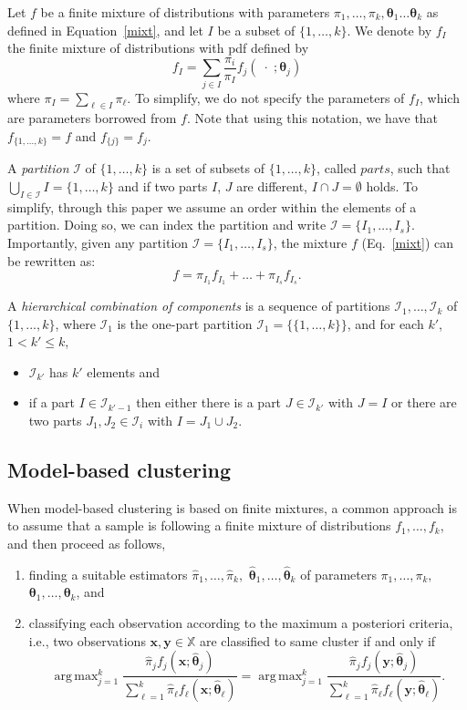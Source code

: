\documentclass[10pt, a4paper]{article}
\DeclareMathOperator*{\argmax}{arg\,max}
\newcommand{\m}[1]{\boldsymbol{#1}}
\begin{document}
Let $f$ be a finite mixture of distributions with  parameters  $\pi_1, \dots, \pi_k, \m\theta_1 \dots \m\theta_k$ as defined in Equation~\ref{mixt}, and let $I$  be a subset of $\{1, \dots, k\}$. We denote by $f_I$ the finite mixture of distributions with pdf defined by
\[
f_I = \sum_{j \in I} \frac{\pi_i}{\pi_I} f_j(\;\cdot\; ; \m\theta_j)
\]
where $\pi_I = \sum_{\ell \in I} \pi_\ell$. To simplify, we do not specify the parameters of $f_I$, which are parameters borrowed from $f$. Note that using this notation, we have that $f_{\{1, \dots, k\}} = f$ and $f_{\{j\}} = f_j$.

A \emph{partition} $\mathcal{I}$ of $\{1, \dots, k\}$ is a set of subsets of $\{1, \dots, k\}$, called $parts$, such that $\bigcup_{I \in \mathcal{I}} I = \{1, \dots, k\}$ and  if two parts $I$, $J$ are different, $I \cap J = \emptyset$ holds. To simplify, through this paper we assume an order within the elements of a partition. Doing so, we can index the partition and write $\mathcal{I} = \{ I_1, \dots, I_s\}$. Importantly, given any partition $\mathcal{I} = \{ I_1, \dots, I_s\}$, the mixture $f$ (Eq.~\ref{mixt}) can be rewritten as:
\[
f = \pi_{I_1} f_{I_1} + \dots + \pi_{I_s} f_{I_s}.
\]


A \emph{hierarchical combination of components} is a sequence of partitions $\mathcal{I}_1, \dots, \mathcal{I}_k$ of $\{1,...,k\}$, where $\mathcal{I}_1$ is the one-part partition $\mathcal{I}_1 = \{ \{1, \dots, k\} \}$, and for each $k'$, $1 <  k' \leq k$,
\begin{itemize}
\item $\mathcal{I}_{k'}$ has $k'$ elements  and
\item if a part $I \in \mathcal{I}_{k'-1}$ then either there is a part $J \in \mathcal{I}_{k'}$ with $J = I$ or there are two parts $J_1, J_2 \in \mathcal{I}_i$ with $I = J_1 \cup J_2$.
\end{itemize}


\subsection*{Model-based clustering}

When model-based clustering is based on finite mixtures, a common approach is to assume that a sample is following a finite mixture of distributions $f_1, \dots, f_k$, and then proceed as follows, 
\begin{enumerate}
\item finding a suitable estimators $\hat{\pi}_1, \dots, \hat{\pi}_k,$ $\hat{\m\theta}_1, \dots, \hat{\m\theta}_k$ of parameters $\pi_1, \dots, \pi_k,$ $\m\theta_1, \dots, \m\theta_k$, and
\item classifying each observation according to the maximum a posteriori criteria, i.e., two observations $\m x, \m y \in \mathbb{X}$ are classified to same cluster if and only if
\[
\argmax_{j=1}^k \frac{ \hat{\pi}_j f_j(\m x ; \hat{\m\theta}_j) }{\sum_{\ell=1}^k \hat{\pi}_\ell f_\ell(\m x ; \hat{\m\theta}_\ell) } = \argmax_{j=1}^k \frac{ \hat{\pi}_j f_j(\m y ; \hat{\m\theta}_j) }{ \sum_{\ell=1}^k \hat{\pi}_\ell f_\ell(\m y ; \hat{\m\theta}_\ell) }.
\]
\end{enumerate}
\end{document}
